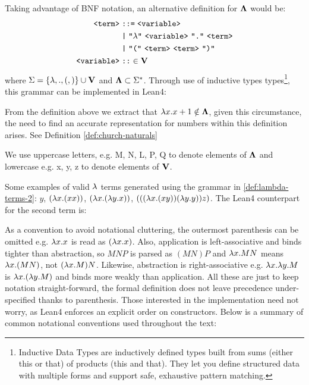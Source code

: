 \begin{definition} Taking advantage of BNF notation, an alternative definition for $\mathbf{\Lambda}$ would be:
  \label{def:lambda-terms-2}
  \begin{align*}
    \texttt{<term>} &\;\texttt{::=}\; \texttt{<variable>} \\
                    &\;\texttt{|}\; \texttt{"$\la$"}\ \texttt{<variable>}\ \texttt{"."}\ \texttt{<term>} \\
                    &\;\texttt{|}\; \texttt{"("}\ \texttt{<term>}\ \texttt{<term>}\ \texttt{")"} \\
    \texttt{<variable>} &\;\texttt{::}\in \Vset
  \end{align*}
  where \( \Sigma = \{ \lambda, ., (, )\} \cup \mathbf{V} \) and \( \mathbf{\Lambda} \subset \Sigma^* \). Through use of inductive types types\footnote{Inductive Data Types are inductively defined types built from sums (either this or that) of products (this and that). They let you define structured data with multiple forms and support safe, exhaustive pattern matching.}, this grammar can be implemented in Lean4:

\end{definition}
\begin{remark}
  From the definition above we extract that \( \lambda x . x + 1 \notin \mathbf{\Lambda} \), given this circumstance, the need to find an accurate representation for numbers within this definition arises. See Definition \ref{def:church-naturals}
\end{remark}
\begin{notation}
  We use uppercase letters, e.g. M, N, L, P, Q to denote elements of $\mathbf{\Lambda}$ and lowercase e.g. x, y, z to denote elements of $\mathbf{V}$.
\end{notation}
\begin{example} \label{ex:lambda-terms} Some examples of valid $\lambda$ terms generated using the grammar in \ref{def:lambda-terms-2}:
  \( y \),
  \( (\lambda x. (x x)) \),
  \( (\lambda x. (\lambda y. x)) \),
  \( (((\lambda x. (x y)) (\lambda y. y)) z) \).
  The Lean4 counterpart for the second term is:
\end{example}
As a convention to avoid notational cluttering, the outermost parenthesis can be omitted e.g. $\lambda x.x $ is read as $ ( \lambda x.x ) $. Also, application is left-associative  and binds tighter than abstraction, so $M N P$ is parsed as $(M N) P$ and $\lambda x . M N$ means $\lambda x . (M N)$, not $(\lambda x . M) N$. Likewise, abstraction is right-associative e.g. $\lambda x . \lambda y . M$ is $\lambda x . (\lambda y . M)$ and binds more weakly than application. All these are just to keep notation straight-forward, the formal definition does not leave precedence under-specified thanks to parenthesis. Those interested in the implementation need not worry, as Lean4 enforces an explicit order on constructors. Below is a summary of common notational conventions used throughout the text:
